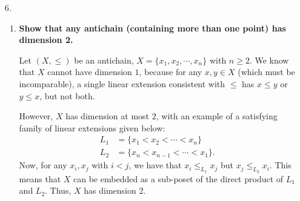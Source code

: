 \documentclass[a4paper,12pt]{article}
\begin{document}
\begin{enumerate}
    \item[6.]
        \begin{enumerate}
            \item
                \boldmath
                \textbf{Show that any antichain (containing more than one point) has dimension 2.} \par
                \unboldmath
                Let $(X, \leq)$ be an antichain, $X = \{ x_1, x_2, \cdots, x_n \}$ with $n \geq 2$. We know that $X$ cannot have dimension $1$, because for any $x, y \in X$ (which must be incomparable), a single linear extension consistent with $\leq$ has $x \leq y$ or $y \leq x$, but not both. \par
                However, $X$ has dimension at most $2$, with an example of a satisfying family of linear extensions given below:
                \begin{align*}
                    L_1 &= \{ x_1 < x_2 < \cdots < x_n \} \\
                    L_2 &= \{ x_n < x_{n - 1} < \cdots < x_1 \}.
                \end{align*}
                Now, for any $x_i, x_j$ with $i < j$, we have that $x_i \leq_{L_1} x_j$ but $x_j \leq_{L_2} x_i$. This means that $X$ can be embedded as a sub-poset of the direct product of $L_1$ and $L_2$. Thus, $X$ has dimension 2.
        \end{enumerate}


\end{enumerate}
\end{document}
